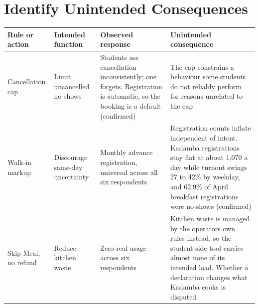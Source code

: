 \documentclass[
  10pt,
  table]{article}
\newcounter{none} %
\begin{document}
\section{Identify Unintended Consequences}\label{identify-unintended-consequences}

{\def\LTcaptype{none} %
\begin{longtable}[]{@{}
  >{\raggedright\arraybackslash}p{}
  >{\raggedright\arraybackslash}p{}
  >{\raggedright\arraybackslash}p{}
  >{\raggedright\arraybackslash}p{}@{}}
\toprule\noalign{}
\begin{minipage}[b]{\linewidth}\raggedright
\cellcolor{pblue}\color{white}\bfseries Rule or action
\end{minipage} & \begin{minipage}[b]{\linewidth}\raggedright
\cellcolor{pblue}\color{white}\bfseries Intended function
\end{minipage} & \begin{minipage}[b]{\linewidth}\raggedright
\cellcolor{pblue}\color{white}\bfseries Observed response
\end{minipage} & \begin{minipage}[b]{\linewidth}\raggedright
\cellcolor{pblue}\color{white}\bfseries Unintended consequence
\end{minipage} \\
\midrule\noalign{}
\endhead
\bottomrule\noalign{}
\endlastfoot
Cancellation cap & Limit uncancelled no-shows & Students use cancellation inconsistently; one forgets. Registration is automatic, so the booking is a default (confirmed) & The cap constrains a behaviour some students do not reliably perform for reasons unrelated to the cap \\
Walk-in markup & Discourage same-day uncertainty & Monthly advance registration, universal across all six respondents & Registration counts inflate independent of intent. Kadamba registrations stay flat at about 1,070 a day while turnout swings 27 to 42\% by weekday, and 62.9\% of April breakfast registrations were no-shows (confirmed) \\
Skip Meal, no refund & Reduce kitchen waste & Zero real usage across six respondents & Kitchen waste is managed by the operators\textquotesingle{} own rules instead, so the student-side tool carries almost none of its intended load. Whether a declaration changes what Kadamba cooks is disputed \\

\end{longtable}}
\end{document}
